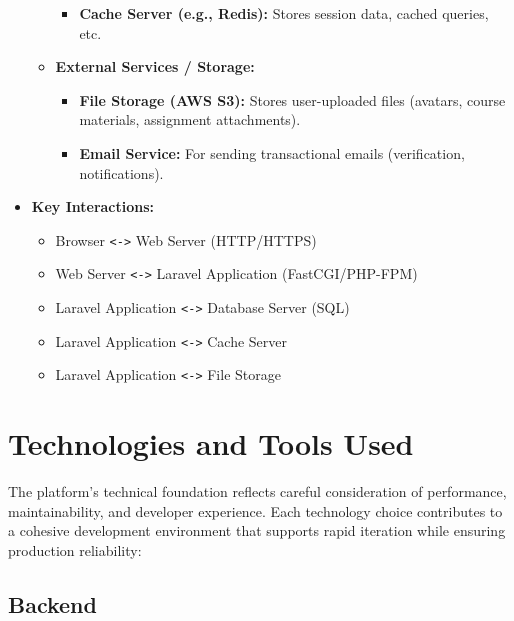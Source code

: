 \documentclass[12pt,a4paper]{article}
\begin{document}
\begin{itemize}
\begin{itemize}
\begin{itemize}
            \item \textbf{Cache Server (e.g., Redis):} Stores session data, cached queries, etc.
        \end{itemize}
        \item \textbf{External Services / Storage:}
        \begin{itemize}
            \item \textbf{File Storage (AWS S3):} Stores user-uploaded files (avatars, course materials, assignment attachments).
            \item \textbf{Email Service:} For sending transactional emails (verification, notifications).
        \end{itemize}
    \end{itemize}
    \item \textbf{Key Interactions:}
    \begin{itemize}
        \item Browser \texttt{<->} Web Server (HTTP/HTTPS)
        \item Web Server \texttt{<->} Laravel Application (FastCGI/PHP-FPM)
        \item Laravel Application \texttt{<->} Database Server (SQL)
        \item Laravel Application \texttt{<->} Cache Server
        \item Laravel Application \texttt{<->} File Storage
    \end{itemize}
\end{itemize}

\section{Technologies and Tools Used}

The platform's technical foundation reflects careful consideration of performance, maintainability, and developer experience. Each technology choice contributes to a cohesive development environment that supports rapid iteration while ensuring production reliability:

\subsection*{Backend}
\end{document}
